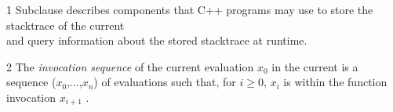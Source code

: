 

1 Subclause  describes components that C++ programs may use to
store the stacktrace of the current \\
and query information about the stored stacktrace at runtime.

2 The \emph{invocation sequence} of the current evaluation $x_0$
in the current  is a sequence
($x_0$,...,$x_n$) of evaluations such that, for $i \geq 0$,
$x_i$ is within the function invocation $x_{i+1}$ .


